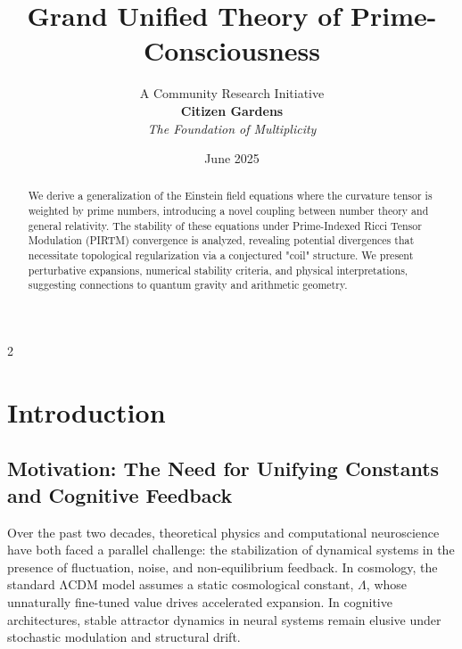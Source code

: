 \documentclass{article}
\theoremstyle{plain}
\theoremstyle{claimstyle}
\begin{document}
\title{Grand Unified Theory of Prime-Consciousness}
\author{\large A Community Research Initiative \\ \textbf{ Citizen Gardens} \\ \textit {The Foundation of Multiplicity}}
\date{June 2025}



\maketitle

\begin{abstract}
We derive a generalization of the Einstein field equations where the curvature tensor is weighted by prime numbers, introducing a novel coupling between number theory and general relativity. The stability of these equations under Prime-Indexed Ricci Tensor Modulation (PIRTM) convergence is analyzed, revealing potential divergences that necessitate topological regularization via a conjectured "coil" structure. We present perturbative expansions, numerical stability criteria, and physical interpretations, suggesting connections to quantum gravity and arithmetic geometry.
\end{abstract}


\newpage
 \begin{multicols}{2}
\begin{singlespace}
\tableofcontents
\end{singlespace}
\end{multicols}



\section{Introduction}

\subsection{Motivation: The Need for Unifying Constants and Cognitive Feedback}

Over the past two decades, theoretical physics and computational neuroscience have both faced a parallel challenge: the stabilization of dynamical systems in the presence of fluctuation, noise, and non-equilibrium feedback. In cosmology, the standard ΛCDM model assumes a static cosmological constant, $\Lambda$, whose unnaturally fine-tuned value drives accelerated expansion. In cognitive architectures, stable attractor dynamics in neural systems remain elusive under stochastic modulation and structural drift.
\end{document}
